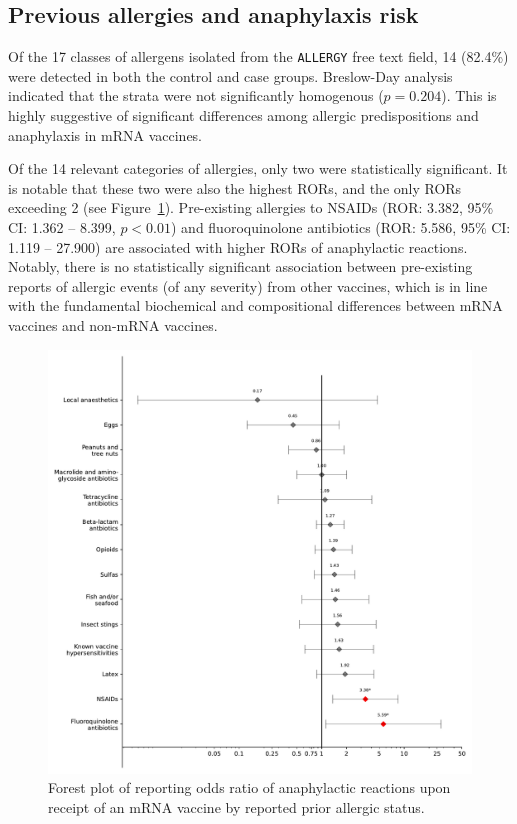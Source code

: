 \documentclass{article}
\begin{document}
\subsection{Previous allergies and anaphylaxis risk}

Of the 17 classes of allergens isolated from the \texttt{ALLERGY} free text field, 14 (82.4\%) were detected in both the control and case groups.
Breslow-Day analysis indicated that the strata were not significantly homogenous ($p = 0.204$).
This is highly suggestive of significant differences among allergic predispositions and anaphylaxis in mRNA vaccines.

Of the 14 relevant categories of allergies, only two were statistically significant.
It is notable that these two were also the highest RORs, and the only RORs exceeding 2 (see Figure~\ref{fig:allergies-forest-plot}).
Pre-existing allergies to NSAIDs (ROR: 3.382, 95\% CI: 1.362 -- 8.399, $p < 0.01$) and fluoroquinolone antibiotics (ROR: 5.586, 95\% CI: 1.119 -- 27.900) are associated with higher RORs of anaphylactic reactions.
Notably, there is no statistically significant association between pre-existing reports of allergic events (of any severity) from other vaccines, which is in line with the fundamental biochemical and compositional differences between mRNA vaccines and non-mRNA vaccines.


\begin{figure}
\centering
\includegraphics[width=12.5 cm]{forest_plot_of_anaphylaxis_by_known_allergies}
\caption{Forest plot of reporting odds ratio of anaphylactic reactions upon receipt of an mRNA vaccine by reported prior allergic status.}
\label{fig:allergies-forest-plot}
\end{figure}
\end{document}
